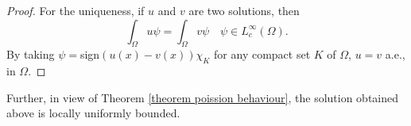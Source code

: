 \documentclass{amsart}
\newcommand{\R}{\mathbb{R}}
\newcommand{\slap}{(-\Delta)^{s}}
\newcommand{\gk}[1]{\mathbb{G}_{#1}}
\begin{document}
\begin{proof}
For the uniqueness, if $u$ and $v$ are two solutions, then 
\begin{equation*}
    \int_{\Omega}u\psi=\int_{\Omega}v\psi \quad \psi\in L_{c}^{\infty}(\Omega).
\end{equation*}
By taking $\psi=$sign$(u(x)-v(x))\chi_{K}$ for any compact set $K$ of $\Omega$, $u=v$ a.e., in $\Omega$.
\end{proof}
Further, in view of Theorem \ref{theorem poission behaviour}, the solution obtained above is locally uniformly bounded. 
\end{document}
